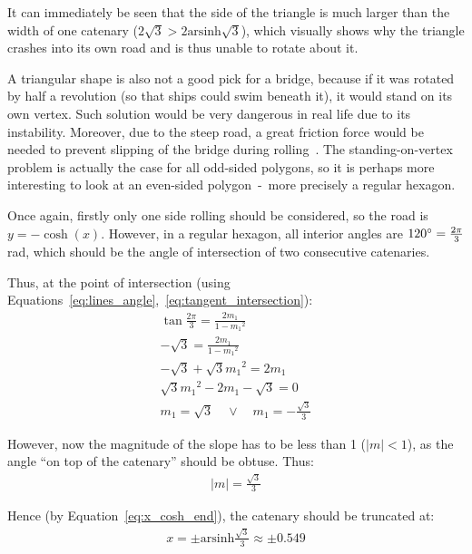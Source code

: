 \documentclass[12pt]{article}
\begin{document}
        It can immediately be seen that the side of the triangle is much larger than the width of one catenary ($2\sqrt{3} > 2\text{arsinh}\sqrt{3}$), which visually shows why the triangle crashes into its own road and is thus unable to rotate about it.

        A triangular shape is also not a good pick for a bridge, because if it was rotated by half a revolution (so that ships could swim beneath it), it would stand on its own vertex. Such solution would be very dangerous in real life due to its instability. Moreover, due to the steep road, a great friction force would be needed to prevent slipping of the bridge during rolling~\cite{bridge_wolfram}. The standing-on-vertex problem is actually the case for all odd-sided polygons, so it is perhaps more interesting to look at an even-sided polygon~-~more precisely a regular hexagon.

        Once again, firstly only one side rolling should be considered, so the road is $y = -\cosh(x)$. However, in a regular hexagon, all interior angles are $120\degree = \frac{2\pi}{3}$ rad, which should be the angle of intersection of two consecutive catenaries. 
        
        Thus, at the point of intersection (using Equations~\ref{eq:lines_angle},~\ref{eq:tangent_intersection}):
        \begin{align}
            \tan \frac{2\pi}{3} = \frac{2m_1}{1 - {m_1}^2} \\
            - \sqrt{3} = \frac{2m_1}{1 - {m_1}^2} \\
            -\sqrt{3} + \sqrt{3}{m_1}^2 = 2m_1 \\
            \sqrt{3}{m_1}^2 - 2m_1 - \sqrt{3} = 0 \\
            m_1 = \sqrt{3} \quad \lor \quad m_1 = - \frac{\sqrt{3}}{3}
        \end{align}

        However, now the magnitude of the slope has to be less than 1 ($|m|<1$), as the angle ``on top of the catenary'' should be obtuse. Thus:
        \begin{align}
            |m| = \frac{\sqrt{3}}{3} 
        \end{align}

        Hence (by Equation~\ref{eq:x_cosh_end}), the catenary should be truncated at:
        \begin{align}
            x = \pm \text{arsinh}\frac{\sqrt{3}}{3} \approx \pm 0.549
        \end{align}
\end{document}

